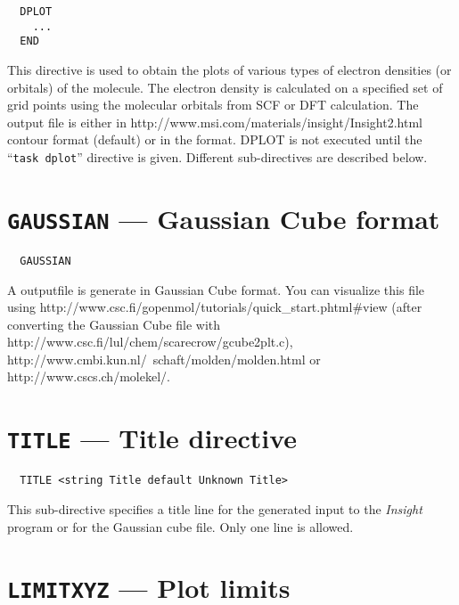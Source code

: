 %
%
\label{sec:dplot}
\begin{verbatim}
  DPLOT
    ...
  END
\end{verbatim}

This directive is used to obtain the plots of various types of electron
densities (or orbitals) of the molecule. The electron density is calculated
on a specified set of grid points using the molecular orbitals
from SCF or DFT calculation. The output file is either in 
{http://www.msi.com/materials/insight/Insight2.html} contour format
(default)
 or in the 
format.  DPLOT is not executed until the ``\verb+task dplot+'' directive is given.  
Different sub-directives are described below.

\section{{\tt GAUSSIAN} --- Gaussian Cube format}

\begin{verbatim}
  GAUSSIAN
\end{verbatim}

A outputfile is generate in Gaussian Cube format.
You can visualize this file using  
{http://www.csc.fi/gopenmol/tutorials/quick_start.phtml\#view}
(after converting the Gaussian Cube file with 
{http://www.csc.fi/lul/chem/scarecrow/gcube2plt.c}),
{http://www.cmbi.kun.nl/~schaft/molden/molden.html} 
 or 
{http://www.cscs.ch/molekel/}.

\section{{\tt TITLE} --- Title directive}

\begin{verbatim}
  TITLE <string Title default Unknown Title>
\end{verbatim}

This sub-directive specifies a title line for the generated
input to the {\em Insight} program or for the Gaussian cube
file. Only one line is allowed.

\section{{\tt LIMITXYZ} --- Plot limits}

